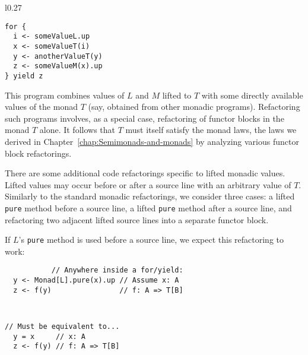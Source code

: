 \begin{wrapfigure}{l}{0.27\columnwidth}%
\vspace{-0.8\baselineskip}
\begin{lstlisting}
for {
  i <- someValueL.up
  x <- someValueT(i)
  y <- anotherValueT(y)
  z <- someValueM(x).up
} yield z
\end{lstlisting}

\vspace{-1.2\baselineskip}
\end{wrapfigure}%

\noindent This program combines values of $L$ and $M$ lifted to
$T$ with some directly available values of the monad $T$ (say, obtained
from other monadic programs). Refactoring such programs involves,
as a special case, refactoring of functor blocks in the monad $T$
alone. It follows that $T$ must itself satisfy the monad laws, \textemdash{}
the laws we derived in Chapter~\ref{chap:Semimonads-and-monads}
by analyzing various functor block refactorings. 

There are some additional code refactorings specific to lifted monadic
values. Lifted values may occur before or after a source line with
an arbitrary value of $T$. Similarly to the standard monadic refactorings,
we consider three cases: a lifted \lstinline!pure! method before
a source line, a lifted \lstinline!pure! method after a source line,
and refactoring two adjacent lifted source lines into a separate functor
block.

If $L$\textsf{'}s \lstinline!pure! method is used before a source line, we
expect this refactoring to work:

\vspace{-0.6\baselineskip}

\noindent \texttt{\textcolor{blue}{\footnotesize{}}}%
\begin{minipage}[t]{0.48\columnwidth}%
\textcolor{darkgray}{\footnotesize{}}
\begin{lstlisting}
           // Anywhere inside a for/yield:
  y <- Monad[L].pure(x).up // Assume x: A
  z <- f(y)                // f: A => T[B]
\end{lstlisting}
%
\end{minipage}\texttt{\textcolor{blue}{\footnotesize{}\hspace*{\fill} }}%
\begin{minipage}[t]{0.48\columnwidth}%
\texttt{\textcolor{blue}{\footnotesize{}}}
\begin{lstlisting}
// Must be equivalent to...
  y = x     // x: A
  z <- f(y) // f: A => T[B]
\end{lstlisting}
%
\end{minipage}\texttt{\textcolor{blue}{\footnotesize{}\smallskip{}
}}{\footnotesize\par}


